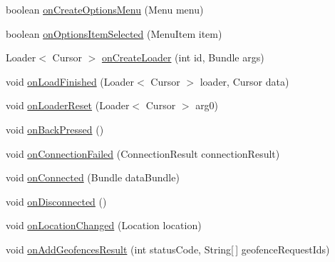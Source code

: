 \begin{DoxyCompactItemize}
\item 
boolean \hyperlink{classuk_1_1ac_1_1swan_1_1digitaltrails_1_1activities_1_1_map_activity_a7b66e700cab5b974365c447fb367765a}{on\+Create\+Options\+Menu} (Menu menu)
\item 
boolean \hyperlink{classuk_1_1ac_1_1swan_1_1digitaltrails_1_1activities_1_1_map_activity_a025f8bf6d684de3fcaaa95e876c986db}{on\+Options\+Item\+Selected} (Menu\+Item item)
\item 
Loader$<$ Cursor $>$ \hyperlink{classuk_1_1ac_1_1swan_1_1digitaltrails_1_1activities_1_1_map_activity_a434830a430be39dccbcf01ad3bf18592}{on\+Create\+Loader} (int id, Bundle args)
\item 
void \hyperlink{classuk_1_1ac_1_1swan_1_1digitaltrails_1_1activities_1_1_map_activity_a96b98cee919b154d54f5f74691a3dfd4}{on\+Load\+Finished} (Loader$<$ Cursor $>$ loader, Cursor data)
\item 
void \hyperlink{classuk_1_1ac_1_1swan_1_1digitaltrails_1_1activities_1_1_map_activity_a970e6bbc7d08e4b34969e00009b514be}{on\+Loader\+Reset} (Loader$<$ Cursor $>$ arg0)
\item 
void \hyperlink{classuk_1_1ac_1_1swan_1_1digitaltrails_1_1activities_1_1_map_activity_abb991902396fdc60eb4a3f6fad8b1dc8}{on\+Back\+Pressed} ()
\item 
void \hyperlink{classuk_1_1ac_1_1swan_1_1digitaltrails_1_1activities_1_1_map_activity_a7d0b0bf6dbf9f32f89ea8a4fdd5813fd}{on\+Connection\+Failed} (Connection\+Result connection\+Result)
\item 
void \hyperlink{classuk_1_1ac_1_1swan_1_1digitaltrails_1_1activities_1_1_map_activity_acb8f0cc22fecf4140525eb3f93c8bca1}{on\+Connected} (Bundle data\+Bundle)
\item 
void \hyperlink{classuk_1_1ac_1_1swan_1_1digitaltrails_1_1activities_1_1_map_activity_ac40ceb283c44ad9e74f9e10824e76257}{on\+Disconnected} ()
\item 
void \hyperlink{classuk_1_1ac_1_1swan_1_1digitaltrails_1_1activities_1_1_map_activity_a05b9ef126f8ccc027b7f1922b6966ca0}{on\+Location\+Changed} (Location location)
\item 
void \hyperlink{classuk_1_1ac_1_1swan_1_1digitaltrails_1_1activities_1_1_map_activity_afeff948328c53e9ad80e19a7ef5bbb56}{on\+Add\+Geofences\+Result} (int status\+Code, String\mbox{[}$\,$\mbox{]} geofence\+Request\+Ids)
\end{DoxyCompactItemize}
